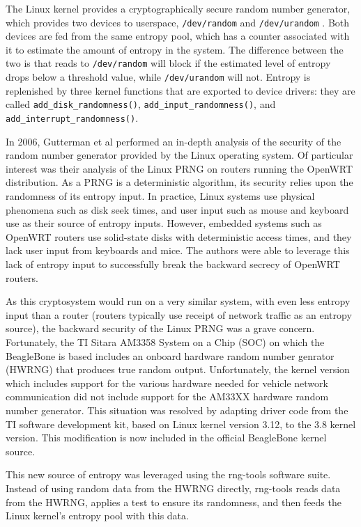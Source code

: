 The Linux kernel provides a cryptographically secure random number generator, which provides two devices to userspace, \texttt{/dev/random} and
\texttt{/dev/urandom}\cite{goichon2012} .  Both devices are fed from the same entropy pool, which has a counter associated with it to estimate the amount of
entropy in the system. The difference between the two is that reads to \texttt{/dev/random} will block if the estimated level of entropy drops below
a threshold value, while \texttt{/dev/urandom} will not. Entropy is replenished by three kernel functions that are exported to device drivers: they are called
\texttt{add\_disk\_randomness()}, \texttt{add\_input\_randomness()}, and \texttt{add\_interrupt\_randomness()}.

In 2006, Gutterman et al \cite{Gutterman2006} performed an in-depth analysis of the security of the random number generator provided by the Linux operating system. 
Of particular interest was their analysis of the Linux PRNG on routers running the OpenWRT distribution. As a PRNG is a deterministic algorithm, its security 
relies upon the randomness of its entropy input. In practice, Linux systems use physical phenomena such as disk seek times, and user input
such as mouse and keyboard use as their source of entropy inputs. However, embedded systems such as OpenWRT routers use solid-state disks
with deterministic access times, and they lack user input from keyboards and mice. The authors were able to leverage this lack of entropy
input to successfully break the backward secrecy of OpenWRT routers.

As this cryptosystem would run on a very similar system, with even less entropy input than a router (routers typically use receipt of network
traffic as an entropy source), the backward security of the Linux PRNG was a grave concern. Fortunately, the TI Sitara AM3358 System on a Chip (SOC)
on which the BeagleBone is based includes an onboard hardware random number genrator (HWRNG) that produces true random output. Unfortunately, the
kernel version which includes support for the various hardware needed for vehicle network communication did not include support for the AM33XX
hardware random number generator. This situation was resolved by adapting driver code from the TI software development kit, based on Linux
kernel version 3.12, to the 3.8 kernel version. This modification is now included in the official BeagleBone kernel source.

This new source of entropy was leveraged using the rng-tools software suite. Instead of using random data from the HWRNG directly, rng-tools
reads data from the HWRNG, applies a test to ensure its randomness, and then feeds the Linux kernel's entropy pool with this data.

